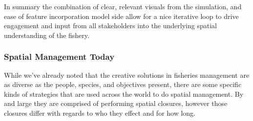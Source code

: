 \documentclass[11pt]{article}
\begin{document}
In summary the combination of clear, relevant visuals from the simulation, and ease of feature incorporation model side allow for a nice iterative loop to drive engagement and input from all stakeholders into the underlying spatial understanding of the fishery.  

\subsubsection{Spatial Management Today} 

While we've already noted that the creative solutions in fisheries management are as diverse as the people, species, and objectives present, there are some specific kinds of strategies that are used across the world to do spatial management. By and large they are comprised of performing spatial closures, however those closures differ with regards to who they effect and for how long. \newline
\end{document}

